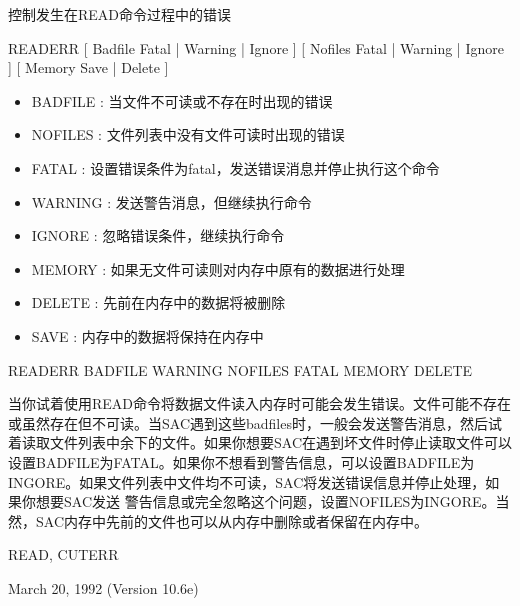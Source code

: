 \label{cmd:readerr}

控制发生在READ命令过程中的错误

READERR [ Badfile Fatal | Warning | Ignore ] [ Nofiles Fatal | Warning | Ignore ] [ Memory Save | Delete ]

\begin{itemize}
\item BADFILE : 当文件不可读或不存在时出现的错误 
\item NOFILES : 文件列表中没有文件可读时出现的错误 
\item FATAL : 设置错误条件为fatal，发送错误消息并停止执行这个命令 
\item WARNING : 发送警告消息，但继续执行命令 
\item IGNORE : 忽略错误条件，继续执行命令 
\item MEMORY : 如果无文件可读则对内存中原有的数据进行处理 
\item DELETE : 先前在内存中的数据将被删除 
\item SAVE : 内存中的数据将保持在内存中 
\end{itemize}

READERR BADFILE WARNING NOFILES FATAL MEMORY DELETE

当你试着使用READ命令将数据文件读入内存时可能会发生错误。文件可能不存在或虽然存在但不可读。当SAC遇到这些badfiles时，一般会发送警告消息，然后试着读取文件列表中余下的文件。如果你想要SAC在遇到坏文件时停止读取文件可以设置BADFILE为FATAL。如果你不想看到警告信息，可以设置BADFILE为INGORE。如果文件列表中文件均不可读，SAC将发送错误信息并停止处理，如果你想要SAC发送	警告信息或完全忽略这个问题，设置NOFILES为INGORE。当然，SAC内存中先前的文件也可以从内存中删除或者保留在内存中。

READ, CUTERR

March 20, 1992 (Version 10.6e)
